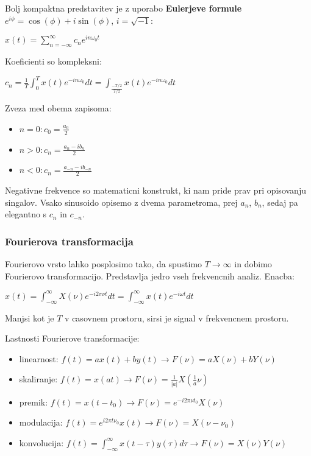 \documentclass{article}
\begin{document}
\begin{multicols}{4}
	Bolj kompaktna predstavitev je z uporabo \textbf{Eulerjeve formule} $e^{i \phi} = \cos(\phi) + i \sin(\phi)$, $i = \sqrt{-1}$:
	\begin{center}
		\begin{math}
			x(t) = \sum_{n = - \infty}^{\infty} c_n e^{i n \omega_0 t}
		\end{math}
	\end{center}
	Koeficienti so kompleksni:
	\begin{center}
		\begin{math}
			c_n = \frac{1}{T} \int_0^T x(t)e^{-in \omega_0} dt = \int_{\frac{-T/2}{T/2}} x(t) e^{-in \omega_0} dt
		\end{math}
	\end{center}
	Zveza med obema zapisoma:
	\begin{itemize}
		\item $n = 0: c_0 = \frac{a_0}{2}$
		\item $n > 0: c_n = \frac{a_n - i b_n}{2}$
		\item $n < 0: c_n = \frac{a_{-n} - i b_{-n}}{2}$
	\end{itemize}

	Negativne frekvence so matematicni konstrukt, ki nam pride prav pri opisovanju singalov.
	Vsako sinusoido opisemo z dvema parametroma, prej $a_n$, $b_n$, sedaj pa elegantno
	s $c_n$ in $c_{-n}$.

	\subsubsection{Fourierova transformacija}
	Fourierovo vrsto lahko posplosimo tako, da spustimo $T \rightarrow \infty$ in dobimo Fourierovo transformacijo.
	Predstavlja jedro vseh frekvencnih analiz.
	Enacba:
	\begin{center}
		\begin{math}
			x(t) = \int_{-\infty}^{\infty} X(\nu)e^{-i2 \pi \nu t} dt = \int_{-\infty}^{\infty} x(t) e^{-i \omega t} dt
		\end{math}
	\end{center}
	Manjsi kot je $T$ v casovnem prostoru, sirsi je signal v frekvencnem prostoru.

	Lastnosti Fourierove transformacije:
	\begin{itemize}
		\item linearnost: $f(t) = ax(t) + by(t) \rightarrow F(\nu) = a X(\nu) + bY(\nu)$
		\item skaliranje: $f(t) = x(at) \rightarrow F(\nu) = \frac{1}{|a|} X(\frac{1}{a} \nu)$
		\item premik: $f(t) = x(t - t_0) \rightarrow F(\nu) = e^{-i2\pi \nu t_0} X(\nu)$
		\item modulacija: $f(t) = e^{i 2 \pi t \nu_0} x(t) \rightarrow F(\nu) = X(\nu - \nu_0)$
		\item konvolucija: $f(t) = \int_{- \infty}^{\infty} x(t - \tau)y(\tau) d\tau \rightarrow F(\nu) = X(\nu) Y(\nu)$
	\end{itemize}


\end{multicols}
\end{document}
